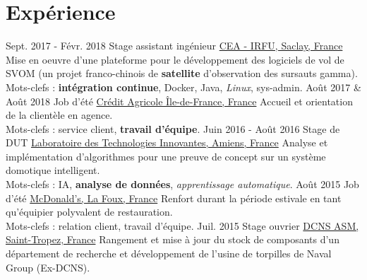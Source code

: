 \documentclass[a4paper]{twentysecondcv} %
\begin{document}
\section{Expérience}

\begin{twenty} %
    \twentyitem
    	{Sept. 2017 -}
                {Févr. 2018}
        {Stage assistant ingénieur}
        {\href{http://irfu.cea.fr/}{CEA - IRFU, Saclay, France}}
        {}
        {Mise en oeuvre d'une plateforme pour le développement des logiciels de vol de SVOM (un projet franco-chinois de \textbf{satellite} d'observation des sursauts gamma).\\Mots-clefs : \textbf{intégration continue}, Docker, Java, \textit{Linux}, sys-admin.}
    \twentyitem
        {Août 2017 \&}
                {Août 2018}
        {Job d'été}
        {\href{https://ca-paris.com/}{Crédit Agricole Île-de-France, France}}
        {}
        {Accueil et orientation de la clientèle en agence.\\Mots-clefs : service client, \textbf{travail d'équipe}.}
	\twentyitem
    	{Juin 2016 -}
		{Août 2016}
        {Stage de DUT}
        {\href{http://lti-picardie.fr/}{Laboratoire des Technologies Innovantes, Amiens, France}}
        {}
        {Analyse et implémentation d'algorithmes pour une preuve de concept sur un système domotique intelligent.\\Mots-clefs : IA, \textbf{analyse de données}, \textit{apprentissage automatique}.}
    \twentyitem
   		{Août 2015}
        {}
        {Job d'été}
        {\href{https://www.restaurants.mcdonalds.fr/mcdonalds-gassin}{McDonald's, La Foux, France}}
        {}
        {Renfort durant la période estivale en tant qu'équipier polyvalent de restauration.\\Mots-clefs : relation client, travail d'équipe.}
     \twentyitem
   		{Juil. 2015}
		{}
        {Stage ouvrier}
        {\href{https://www.naval-group.com/fr/}{DCNS ASM, Saint-Tropez, France}}
        {}
        {Rangement et mise à jour du stock de composants d'un département de recherche et développement de l'usine de torpilles de Naval Group (Ex-DCNS).}
\end{twenty}

\end{document}
